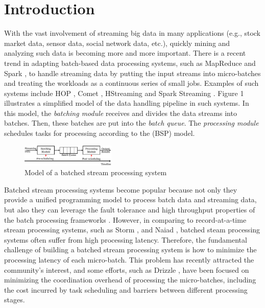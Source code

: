 \documentclass[10pt,conference,compsocconf,letterpaper]{IEEEtran}
\begin{document}
\section{Introduction}

  With the vast involvement of streaming big data in many applications (e.g., stock market data, sensor data, social network data, etc.), quickly mining and analyzing such data is becoming more and more important. There is a recent trend in adapting batch-based data processing systems, such as MapReduce \cite{Dean2004} and Spark \cite{Zaharia2010C}, to handle streaming data by putting the input streams into micro-batches and treating the workloads as a continuous series of small jobs. Examples of such systems include HOP \cite{Condie2010}, Comet \cite{He2010}, HStreaming \cite{HStreaming} and Spark Streaming \cite{Zaharia2013}. Figure 1 illustrates a simplified model of the data handling pipeline in such systems. In this model, the \emph{batching module} receives and divides the data streams into batches. Then, these batches are put into the \emph{batch queue}. The \emph{processing module} schedules tasks for processing according to the (BSP) model.
  \begin{figure}[htbp]
    \centering
    \includegraphics[width=0.40\textwidth]{FigureModel}
    \caption{Model of a batched stream processing system}\label{Fig. 1:}
  \end{figure}

  Batched stream processing systems become popular because not only they provide a unified programming model to process batch data and streaming data, but also they can leverage the fault tolerance and high throughput properties of the batch processing frameworks \cite{spark-summit}. However, in comparing to record-at-a-time stream processing systems, such as Storm \cite{storm-web}, and Naiad \cite{Murray2013}, batched steam processing systems often suffer from high processing latency. Therefore, the fundamental challenge of building a batched stream processing system is how to minimize the processing latency of each micro-batch. This problem has recently attracted the community's interest, and some efforts, such as Drizzle \cite{drizzle}, have been focused on minimizing the coordination overhead of processing the micro-batches, including the cost incurred by task scheduling and barriers between different processing stages.
\end{document}
